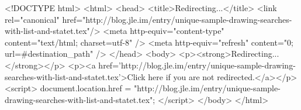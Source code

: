 <!DOCTYPE html>
<html>
<head>
<title>Redirecting...</title>
<link rel="canonical" href="http://blog.jle.im/entry/unique-sample-drawing-searches-with-list-and-statet.tex"/>
<meta http-equiv="content-type" content="text/html; charset=utf-8" />
<meta http-equiv="refresh" content="0; url=#{destination_path}" />
</head>
<body>
  <p><strong>Redirecting...</strong></p>
  <p><a href='http://blog.jle.im/entry/unique-sample-drawing-searches-with-list-and-statet.tex'>Click here if you are not redirected.</a></p>
  <script>
    document.location.href = "http://blog.jle.im/entry/unique-sample-drawing-searches-with-list-and-statet.tex";
  </script>
</body>
</html>
